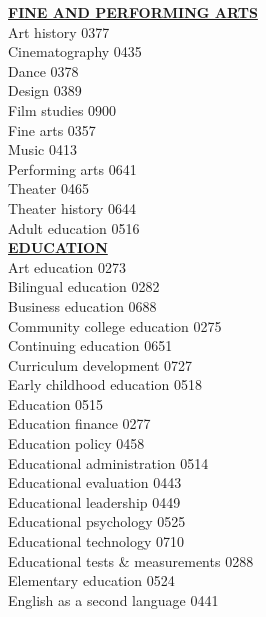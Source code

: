 \documentclass[9pt,twoside]{article}
\newcommand{\categoryheading}[1]{{\fontsize{8}{11}\selectfont \textbf{\uline{#1}}}}
\begin{document}
\begin{multicols}{3}
\categoryheading{FINE AND PERFORMING ARTS} \leavevmode \\
Art history \hfill 0377 \leavevmode \\
Cinematography \hfill 0435 \leavevmode \\
Dance \hfill 0378 \leavevmode \\
Design \hfill 0389 \leavevmode \\
Film studies \hfill 0900 \leavevmode \\
Fine arts \hfill 0357 \leavevmode \\
Music \hfill 0413 \leavevmode \\
Performing arts \hfill 0641 \leavevmode \\
Theater \hfill 0465 \leavevmode \\
Theater history \hfill 0644 \leavevmode \\
Adult education \hfill 0516 \leavevmode \\
\columnbreak
\categoryheading{EDUCATION} \leavevmode \\
Art education \hfill 0273 \leavevmode \\
Bilingual education \hfill 0282 \leavevmode \\
Business education \hfill 0688 \leavevmode \\
Community college education \hfill 0275 \leavevmode \\
Continuing education \hfill 0651 \leavevmode \\
Curriculum development \hfill 0727 \leavevmode \\
Early childhood education \hfill 0518 \leavevmode \\
Education \hfill 0515 \leavevmode \\
Education finance \hfill 0277 \leavevmode \\
Education policy \hfill 0458 \leavevmode \\
Educational administration \hfill 0514 \leavevmode \\
Educational evaluation \hfill 0443 \leavevmode \\
Educational leadership \hfill 0449 \leavevmode \\
Educational psychology \hfill 0525 \leavevmode \\
Educational technology \hfill 0710 \leavevmode \\
Educational tests \& measurements \hfill 0288 \leavevmode \\
Elementary education \hfill 0524 \leavevmode \\
English as a second language \hfill 0441 \leavevmode \\

\end{multicols}
\end{document}
